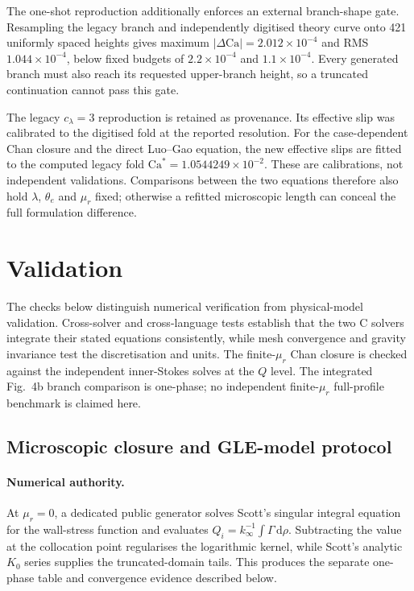 \documentclass[11pt,a4paper]{article}
\newcommand{\Ca}{\mathrm{Ca}}
\newcommand{\mur}{\mu_r}
\begin{document}
The one-shot reproduction additionally enforces an external branch-shape
gate. Resampling the legacy branch and independently digitised theory curve
onto 421 uniformly spaced heights gives maximum
$|\Delta\Ca|=2.012\times10^{-4}$ and RMS $1.044\times10^{-4}$, below fixed
budgets of $2.2\times10^{-4}$ and $1.1\times10^{-4}$. Every generated branch
must also reach its requested upper-branch height, so a truncated continuation
cannot pass this gate.

The legacy $c_{\lambda}=3$ reproduction is retained as provenance. Its
effective slip was calibrated to the digitised fold at the reported resolution.
For the case-dependent Chan closure and the direct Luo--Gao equation, the new
effective slips are fitted to the computed legacy fold
$\Ca^{*}=1.0544249\times10^{-2}$. These are calibrations, not independent
validations. Comparisons between the two equations therefore also hold
$\lambda$, $\theta_e$ and $\mur$ fixed; otherwise a refitted microscopic length
can conceal the full formulation difference.

\section{Validation}
\label{sec:validation}

The checks below distinguish numerical verification from physical-model
validation. Cross-solver and cross-language tests establish that the two C
solvers integrate their stated equations consistently, while mesh convergence
and gravity invariance test the discretisation and units. The finite-$\mur$
Chan closure is checked against the independent inner-Stokes solves at the
$Q$ level. The integrated Fig.~4b branch comparison is one-phase; no
independent finite-$\mur$ full-profile benchmark is claimed here.

\subsection{Microscopic closure and GLE-model protocol}
\label{sec:closure-protocol}

\paragraph{Numerical authority.}
At $\mur=0$, a dedicated public generator solves Scott's singular integral
equation for the wall-stress function and evaluates
$Q_i=k_\infty^{-1}\int\Gamma\,\mathrm d\rho$. Subtracting the value at the
collocation point regularises the logarithmic kernel, while Scott's analytic
$K_0$ series supplies the truncated-domain tails. This produces the separate
one-phase table and convergence evidence described below.
\end{document}
